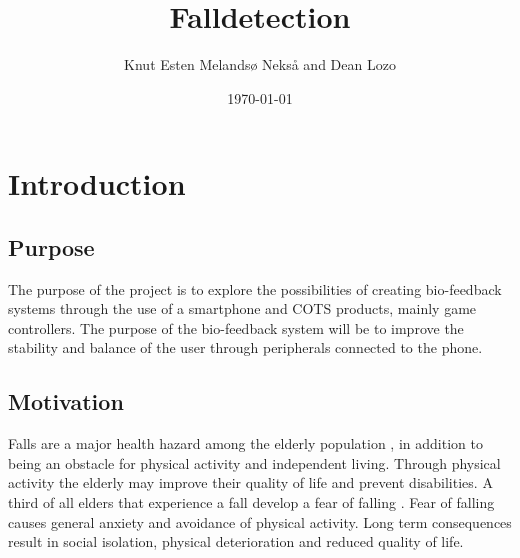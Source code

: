\documentclass[11pt,twoside,a4paper]{report}
\begin{document}
\title{Falldetection}
\author{Knut Esten Melandsø Nekså and Dean Lozo}
\date{\today}
\maketitle


\begin{abstract}

\end{abstract}

\tableofcontents

\chapter{Introduction}

\section{Purpose}
The purpose of the project is to explore the possibilities of creating bio-feedback systems through the use of a smartphone and COTS products, mainly game controllers. The purpose of the bio-feedback system will be to improve the stability and balance of the user through peripherals connected to the phone.

\section{Motivation}
Falls are a major health hazard among the elderly population \cite{falls health hazard}, in addition to being an obstacle for physical activity and independent living. Through physical activity the elderly may improve their quality of life and prevent disabilities\cite{physical activity}. A third of all elders that experience a fall develop a fear of falling \cite{fear of falling}. Fear of falling causes general anxiety and avoidance of physical activity. Long term consequences result in social isolation, physical deterioration and  reduced quality of life.\cite{physical abilities} %
\end{document}
